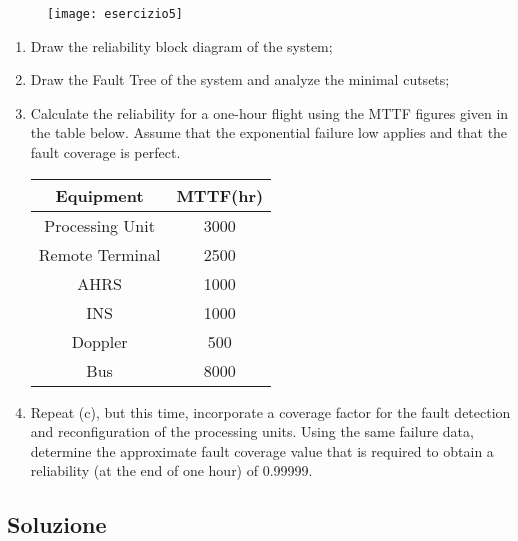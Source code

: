 \begin{figure}[!htbp]
  \centering
  \texttt{[image: esercizio5]}
\end{figure}

\begin{enumerate}
  \item Draw the reliability block diagram of the system;
  \item Draw the Fault Tree of the system and analyze the minimal cutsets;
  \item Calculate the reliability for a one-hour flight using the MTTF figures given in the table
  below. Assume that the exponential failure low applies and that the fault coverage is perfect.

  \begin{center}
  \begin{tabular}{|c|c|}
  	\hline
  	\textbf{Equipment} & \textbf{MTTF(hr)} \\
  	\hline
  	Processing Unit  & 3000 \\
  	\hline
  	Remote Terminal  & 2500 \\
  	\hline
  	AHRS & 1000 \\
  	\hline
  	INS & 1000 \\
  	\hline
  	Doppler & 500 \\
  	\hline
  	Bus & 8000 \\
  	\hline
  \end{tabular}
  \end{center}

  \item Repeat (c), but this time, incorporate a coverage factor for the fault
  detection and reconfiguration of the processing units. Using the same failure
  data, determine the approximate fault coverage value that is required to obtain
  a reliability (at the end of one hour) of 0.99999.
\end{enumerate}

\clearpage
\subsection{Soluzione}
